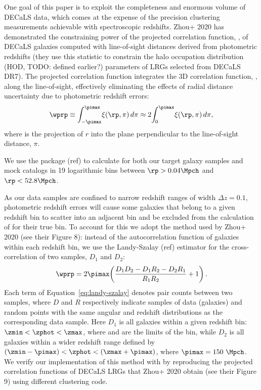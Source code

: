 \documentclass[twocolumn,apj,iop,tighten]{emulateapj2}
\begin{document}
One goal of this paper is to exploit the completeness and enormous volume of DECaLS data, which comes at the expense of the precision clustering measurements achievable with spectroscopic redshifts. Zhou+ 2020 has demonstrated the constraining power of the projected correlation function, \wprp, of DECaLS galaxies computed with line-of-sight distances derived from photometric redshifts (they use this statistic to constrain the halo occupation distribution (HOD, TODO: defined earlier?) parameters of LRGs selected from DECaLS DR7). The projected correlation function integrates the 3D correlation function, \xir, along the line-of-sight, effectively eliminating the effects of radial distance uncertainty due to photometric redshift errors:
%
\begin{equation}
\wprp \equiv \int_{-\pimax}^{\pimax}\!\xi(\rp,\pi)\,d\pi \approx 2\!\int_0^{\pimax}\!\xi(\rp,\pi)\,d\pi,
\end{equation}
%
\noindent where \rp is the projection of $r$ into the plane perpendicular to the line-of-sight distance, $\pi$.

We use the \corrfunc package (ref) to calculate \wprp for both our target galaxy samples and mock catalogs in 19 logarithmic bins between ${\rp>0.04\Mpch}$ and ${\rp<52.8\Mpch}$.

As our data samples are confined to narrow redshift ranges of width ${\Delta z = 0.1}$, photometric redshift errors will cause some galaxies that belong to a given redshift bin to scatter into an adjacent bin and be excluded from the calculation of \wprp for their true bin. To account for this we adopt the method used by Zhou+ 2020 (see their Figure 8): instead of the autocorrelation function of galaxies within each redshift bin, we use the Landy-Szalay (ref) estimator for the cross-correlation of two samples, $D_1$ and $D_2$:
%
\begin{equation}\label{eq:landy-szalay}
\wprp = 2\pimax\!\left(\frac{D_1D_2 - D_1R_2 - D_2R_1}{R_1R_2} + 1 \right).
\end{equation}
%
\noindent Each term of Equation~\ref{eq:landy-szalay} denotes pair counts between two samples, where $D$ and $R$ respectively indicate samples of data (galaxies) and random points with the same angular and redshift distributions as the corresponding data sample. Here $D_1$ is all galaxies within a given redshift bin: ${\zmin < \zphot < \zmax}$, where \zmin and \zmax are the limits of the bin, while $D_2$ is all galaxies within a wider redshift range defined by ${(\zmin-\pimax) < \zphot < (\zmax+\pimax)}$, where ${\pimax=150~\Mpch}$.
We verify our implementation of this method with \corrfunc by reproducing the projected correlation functions of DECaLS LRGs that Zhou+ 2020 obtain (see their Figure 9) using different clustering code.
\end{document}
